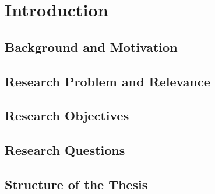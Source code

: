 \chapter{Introduction}
\label{ch:introduction}

\section{Background and Motivation}
\label{sec:background}

\section{Research Problem and Relevance}
\label{sec:research-problem}

\section{Research Objectives}
\label{sec:research-objectives}

\section{Research Questions}
\label{sec:research-questions}

\section{Structure of the Thesis}
\label{sec:structure}

